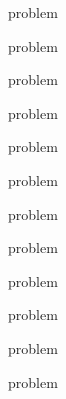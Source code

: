 \documentclass[11pt,a4paper,oneside,final]{article}
\begin{document}
{problem}

{problem}

{problem}

{problem}

{problem}

{problem}

{problem}

{problem}

{problem}

{problem}

{problem}

{problem}
\end{document}
